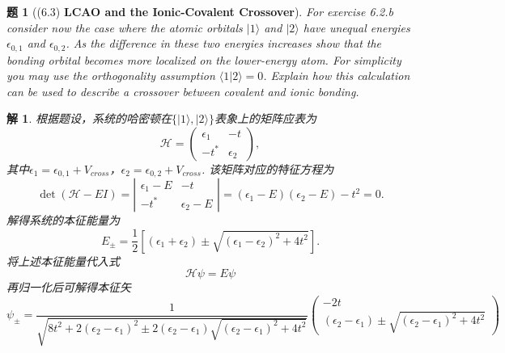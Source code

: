 \documentclass[UTF8,10pt,a4paper]{article}
\theoremstyle{Problem}
\newtheorem{prob}{题}
\theoremstyle{Solution}
\newtheorem*{sol}{解}
\begin{document}
\begin{prob}[(6.3) \textbf{LCAO and the Ionic-Covalent Crossover}]
    For exercise 6.2.b consider now the case where the atomic orbitals $\lvert 1\rangle$ and $\lvert 2\rangle$ have unequal energies $\epsilon_{0,1}$ and $\epsilon_{0,2}$. As the difference in these two energies increases show that the bonding orbital becomes more localized on the lower-energy atom. For simplicity you may use the orthogonality assumption $\langle 1\vert 2\rangle=0$. Explain how this calculation can be used to describe a crossover between covalent and ionic bonding.
\end{prob}
\begin{sol}
    根据题设，系统的哈密顿在$\{\lvert 1\rangle,\lvert 2\rangle\}$表象上的矩阵应表为
    \begin{equation}
        \mathcal{H}=\left(\begin{matrix}
            \epsilon_1&-t\\
            -t^*&\epsilon_2
        \end{matrix}\right),
    \end{equation}
    其中$\epsilon_1=\epsilon_{0,1}+V_{cross}$，$\epsilon_2=\epsilon_{0,2}+V_{cross}$. 该矩阵对应的特征方程为
    \begin{equation}
        \det(\mathcal{H}-EI)=\left\lvert\begin{matrix}
            \epsilon_1-E&-t\\
            -t^*&\epsilon_2-E
        \end{matrix}\right\rvert=(\epsilon_1-E)(\epsilon_2-E)-t^2=0.
    \end{equation}
    解得系统的本征能量为
    \begin{equation}
        E_{\pm}=\frac{1}{2}\left[(\epsilon_1+\epsilon_2)\pm\sqrt{(\epsilon_1-\epsilon_2)^2+4t^2}\right].
    \end{equation}
    将上述本征能量代入式
    \begin{equation}
        \mathcal{H}\psi=E\psi
    \end{equation}
    再归一化后可解得本征矢
    \begin{equation}
        \psi_{\pm}=\frac{1}{\sqrt{8t^2+2(\epsilon_2-\epsilon_1)^2\pm 2(\epsilon_2-\epsilon_1)\sqrt{(\epsilon_2-\epsilon_1)^2+4t^2}}}\left(\begin{matrix}
            -2t\\
            (\epsilon_2-\epsilon_1)\pm\sqrt{(\epsilon_2-\epsilon_1)^2+4t^2}
        \end{matrix}\right)
    \end{equation}

\end{sol}
\end{document}
